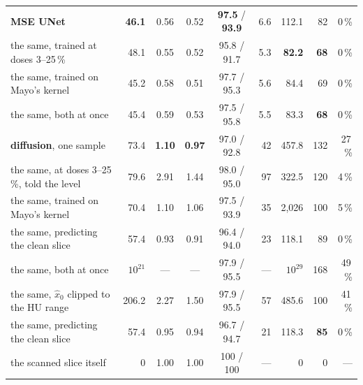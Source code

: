\begin{table}[H]
\begin{tabular}{l r c c c r | r r r}
\textbf{MSE UNet}              &  \textbf{46.1} & 0.56 & 0.52 & \textbf{97.5} / \textbf{93.9} & 6.6 & 112.1 &  82 & 0\,\% \\
\quad the same, trained at doses 3--25\,\% & 48.1 & 0.55 & 0.52 & 95.8 / 91.7 & 5.3 & \textbf{82.2} & \textbf{68} & 0\,\% \\
\quad the same, trained on Mayo's kernel & 45.2 & 0.58 & 0.51 & 97.7 / 95.3 & 5.6 & 84.4 & 69 & 0\,\% \\
\quad the same, both at once & 45.4 & 0.59 & 0.53 & 97.5 / 95.8 & 5.5 & 83.3 & \textbf{68} & 0\,\% \\
\textbf{diffusion}, one sample &  73.4 & \textbf{1.10} & \textbf{0.97} & 97.0 / 92.8 & 42 & 457.8 & 132 & 27\,\% \\
\quad the same, at doses 3--25\,\%, told the level & 79.6 & 2.91 & 1.44 & 98.0 / 95.0 & 97 & 322.5 & 120 & 4\,\% \\
\quad the same, trained on Mayo's kernel & 70.4 & 1.10 & 1.06 & 97.5 / 93.9 & 35 & 2{,}026 & 100 & 5\,\% \\
\quad\quad the same, predicting the clean slice & 57.4 & 0.93 & 0.91 & 96.4 / 94.0 & 23 & 118.1 & 89 & 0\,\% \\
\quad the same, both at once & $10^{21}$ & --- & --- & 97.9 / 95.5 & --- & $10^{29}$ & 168 & 49\,\% \\
\quad\quad the same, $\hat x_0$ clipped to the HU range & 206.2 & 2.27 & 1.50 & 97.9 / 95.5 & 57 & 485.6 & 100 & 41\,\% \\
\quad\quad the same, predicting the clean slice & 57.4 & 0.95 & 0.94 & 96.7 / 94.7 & 21 & 118.3 & \textbf{85} & 0\,\% \\
the scanned slice itself       &   0   & 1.00 & 1.00 & 100 / 100 & --- & 0 & 0 & --- \\
\hline
\end{tabular}
\end{table}

